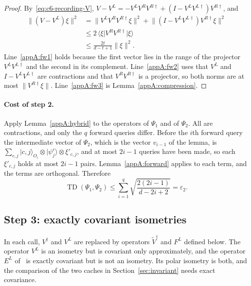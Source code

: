 \documentclass[11pt,letterpaper]{article}
\theoremstyle{definition}\newtheorem{definition}[theorem]{Definition}
\newcommand{\TD}{\operatorname{TD}}
\newcommand{\ket}[1]{\lvert#1\rangle}
\newcommand{\bra}[1]{\langle#1\rvert}
\newcommand{\norm}[1]{\lVert#1\rVert}
\begin{document}
\begin{proof}
By~\eqref{eq:c6-recording-V},
$V-V^L=-V^LV^RV^{R\dagger}+(I-V^LV^{L\dagger})V^{R\dagger}$, and
\begin{align}
 \norm{(V-V^L)\xi}^2
 &=\norm{V^LV^RV^{R\dagger}\xi}^2
   +\norm{(I-V^LV^{L\dagger})V^{R\dagger}\xi}^2 \label{appA:fw1}\\
 &\le2\,\bra\xi V^RV^{R\dagger}\ket\xi \label{appA:fw2}\\
 &\le\frac{2t}{d-t+1}\norm\xi^2 . \label{appA:fw3}
\end{align}
Line~\eqref{appA:fw1} holds because the first vector lies in the range
of the projector $V^LV^{L\dagger}$ and the second in its complement.
Line~\eqref{appA:fw2} uses that $V^L$ and $I-V^LV^{L\dagger}$ are
contractions and that $V^RV^{R\dagger}$ is a projector, so both norms
are at most $\norm{V^{R\dagger}\xi}$.
Line~\eqref{appA:fw3} is Lemma~\ref{appA:compression}.
\end{proof}

\paragraph{Cost of step 2.}
Apply Lemma~\ref{appA:hybrid} to the operators of $\Psi_1$ and of
$\Psi_2$. All are contractions, and only the $q$ forward queries
differ. Before the $i$th forward query the intermediate vector of
$\Psi_2$, which is the vector $v_{i-1}$ of the lemma, is
$\sum_{c,j}\ket{c,j}_{O_i}\otimes\ket{\psi^c_j}\otimes\xi'_{c,j}$, and
at most $2i-1$ queries have been made, so each $\xi'_{c,j}$ holds at
most $2i-1$ pairs. Lemma~\ref{appA:forward} applies to each term, and
the terms are orthogonal. Therefore
\begin{equation}\label{eq:c6-E}
 \TD(\Psi_1,\Psi_2)
 \le\sum_{i=1}^q\sqrt{\frac{2(2i-1)}{d-2i+2}}=\varepsilon_2.
\end{equation}

\subsection{Step 3: exactly covariant isometries}\label{sec:c6-A2}

In each call, $V^\dagger$ and $V^L$ are replaced by operators
$\widetilde V^\dagger$ and $F^L$ defined below. The operator $V^L$ is
an isometry but is covariant only approximately, and the operator $E^L$
of~\cite{mahuang2025} is exactly covariant but is not an isometry. Its
polar isometry is both, and the comparison of the two caches in
Section~\ref{sec:invariant} needs exact covariance.
\end{document}
